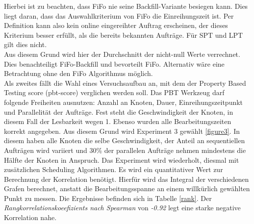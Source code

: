 Hierbei ist zu beachten, dass FiFo nie seine Backfill-Variante besiegen kann. Dies liegt daran, dass das Auswahlkriterium von FiFo die Einreihungszeit ist. Per Definition kann also kein online eingereihter Auftrag erscheinen, der dieses Kriterium besser erfüllt, als die bereits bekannten Aufträge. Für SPT und LPT gilt dies nicht.\\
Aus diesem Grund wird hier der Durchschnitt der nicht-null Werte verrechnet. Dies benachteiligt FiFo-Backfill und bevorteilt FiFo. Alternativ wäre eine Betrachtung ohne den FiFo Algorithmus möglich.\\
Als zweites fällt die Wahl eines Versuchsaufbau an, mit dem der Property Based Testing score (pbt-score) verglichen werden soll. Das PBT Werkzeug darf folgende Freiheiten ausnutzen: Anzahl an Knoten, Dauer, Einreihungszeitpunkt und Parallelität der Aufträge. Fest steht die Geschwindigkeit der Knoten, in diesem Fall der Lesbarkeit wegen 1. Ebenso wurden alle Bearbeitungszeiten korrekt angegeben. Aus diesem Grund wird Experiment 3 gewählt \ref{figure3}. In diesem haben alle Knoten die selbe Geschwindigkeit, der Anteil an sequentiellen Aufträgen wird variiert und 30\% der parallelen Aufträge nehmen mindestens die Hälfte der Knoten in Anspruch. Das Experiment wird wiederholt, diesmal mit zusätzlichen Scheduling Algorithmen. Es wird ein quantitativer Wert zur Berechnung der Korrelation benötigt. Hierfür wird das Integral der verschiedenen Grafen berechnet, anstatt die Bearbeitungsspanne an einem willkürlich gewählten Punkt zu messen.
Die Ergebnisse befinden sich in Tabelle \ref{rank}. Der \emph{Rangkorrelationskoeefizients nach Spearman} von \emph{-0.92}  legt eine starke negative Korrelation nahe. \\

